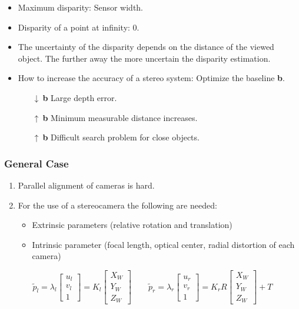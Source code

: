 \documentclass[10pt,a4paper]{scrartcl}
\begin{document}
\begin{multicols*}{2}
\begin{itemize}
\item Maximum disparity: Sensor width.
\item Disparity of a point at infinity: 0.
\item The uncertainty of the disparity depends on the distance of the viewed object. The further away the more uncertain the disparity estimation.
\item How to increase the accuracy of a stereo system: Optimize the baseline \textbf{b}.
\begin{itemize}
\item [$\downarrow\ $\textbf{b}] Large depth error.
\item [$\uparrow\ $\textbf{b}] Minimum measurable distance increases.
\item [$\uparrow\ $\textbf{b}] Difficult search problem for close objects.
\end{itemize}
\end{itemize}

\subsubsection{General Case}


\begin{enumerate}
\item Parallel alignment of cameras is hard.
\item For the use of a stereocamera the following are needed:
\begin{itemize}
\item Extrinsic parameters (relative rotation and translation)
\item Intrinsic parameter (focal length, optical center, radial distortion of each camera)
\end{itemize}
\end{enumerate}

\begin{equation*}
\tilde{p}_l=\lambda_l\begin{bmatrix}u_l\\v_l\\1\end{bmatrix} = K_l\begin{bmatrix}X_W\\Y_W\\Z_W\end{bmatrix}\qquad \tilde{p}_r=\lambda_r\begin{bmatrix}u_r\\v_r\\1\end{bmatrix}=K_rR\begin{bmatrix}X_W\\Y_W\\Z_W\end{bmatrix}+T
\end{equation*}


\end{multicols*}
\end{document}
